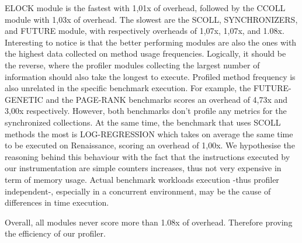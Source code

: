 \documentclass[]{usiinfthesis}
\begin{document}
ELOCK module is the fastest with 1,01x of overhead, followed by the CCOLL module with 1,03x of overhead. The slowest are the SCOLL, SYNCHRONIZERS, and FUTURE module, with respectively overheads of 1,07x, 1,07x, and 1.08x. Interesting to notice is that the better performing modules are also the ones with the highest data collected on method usage frequencies. Logically, it should be the reverse, where the profiler modules collecting the largest number of information should also take the longest to execute. Profiled method frequency is also unrelated in the specific benchmark execution. For example, the FUTURE-GENETIC and the PAGE-RANK benchmarks scores an overhead of 4,73x and 3,00x respectively. However, both benchmarks don't profile any metrics for the synchronized collections. At the same time, the benchmark that uses SCOLL methods the most is LOG-REGRESSION which takes on average the same time to be executed on Renaissance, scoring an overhead of 1,00x. We hypothesise the reasoning behind this behaviour with the fact that the instructions executed by our instrumentation are simple counters increases, thus not very expensive in term of memory usage. Actual benchmark workloads execution -thus profiler independent-, especially in a concurrent environment, may be the cause of differences in time execution.

Overall, all modules never score more than 1.08x of overhead. Therefore proving the efficiency of our profiler.
\end{document}
